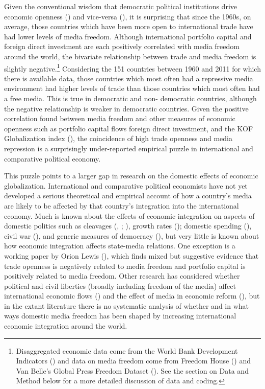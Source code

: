 \documentclass[12pt]{report}
\begin{document}
Given the conventional wisdom that democratic political institutions drive economic openness
(\citealt{Milner:2005ci}) and vice-versa (\citealt{EICHENGREEN:2008gg}), it is surprising that since
the 1960s, on average, those countries which have been more open to international trade have had
lower levels of media freedom. Although international portfolio capital and foreign direct
investment are each positively correlated with media freedom around the world, the bivariate
relationship between trade and media freedom is slightly negative.\footnote{Disaggregated economic
data come from the World Bank Development Indicators (\citealt{WorldDevelopmentIn:2012wl}) and data
on media freedom come from Freedom House () and Van Belle's Global Press Freedom Dataset
(\citealt{van2000press}). See the section on Data and Method below for a more detailed discussion of
data and coding.} Considering the 151 countries between 1960 and 2011 for which there is available
data, those countries which most often had a repressive media environment had higher levels of trade
than those countries which most often had a free media. This is true in democratic and non-
democratic countries, although the negative relationship is weaker in democratic countries. Given
the positive correlation found between media freedom and other measures of economic openness such as
portfolio capital flows foreign direct investment, and the KOF Globalization index
(\citealt{dreher2008measuring}), the coincidence of high trade openness and media repression is a
surprisingly under-reported empirical puzzle in international and comparative political economy.

This puzzle points to a larger gap in research on the domestic effects of economic globalization.
International and comparative political economists have not yet developed a serious theoretical and
empirical account of how a country's media are likely to be affected by that country's integration
into the international economy. Much is known about the effects of economic integration on aspects
of domestic politics such as cleavages (\citealt{Rogowski:1987ip}, \citeyear{Rogowski:1989wm};
\citealt{hiscox2002international}), growth rates (\citealt{Rodriguez:2001uw}); domestic spending
(\citealt{Rodrik:1998te,Burgoon:2001dp}), civil war (\citealt{Barbieri:2005uk,Bussmann:2007vx}), and
generic measures of democracy (\citealt{EICHENGREEN:2008gg,Li:2003vj}), but very little is known
about how economic integration affects state-media relations. One exception is a working paper by
Orion Lewis (\citeyear{Lewis:qDvYbWlU}), which finds mixed but suggestive evidence that trade
openness is negatively related to media freedom and portfolio capital is positively related to media
freedom. Other research has considered whether political and civil liberties (broadly including
freedom of the media) affect international economic flows (\cite{Adam:2007gn}) and the effect of
media in economic reform (\citealt{Coyne:2004bq,Islam:2002uc}), but in the extant literature there
is no systematic analysis of whether and in what ways domestic media freedom has been shaped by
increasing international economic integration around the world.
\end{document}
